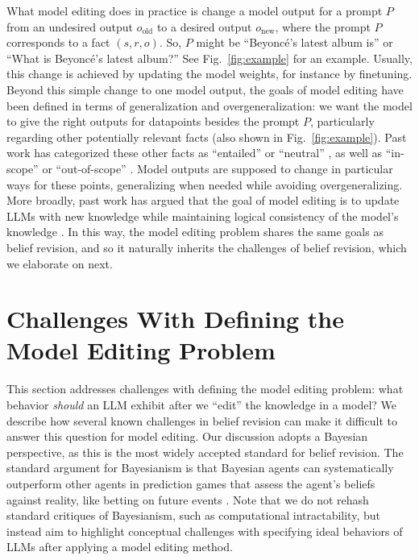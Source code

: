 \documentclass[11pt,a4paper]{article}
\newcommand{\beyonce}{Beyonc\'{e}\xspace}
\begin{document}
What model editing does in practice is change a model output for a prompt $P$ from an undesired output $o_\textrm{old}$ to a desired output $o_\textrm{new}$, where the prompt $P$ corresponds to a fact $(s,r,o)$. So, $P$ might be ``\beyonce's latest album is'' or ``What is \beyonce's latest album?'' See Fig.~\ref{fig:example} for an example. Usually, this change is achieved by updating the model weights, for instance by finetuning. Beyond this simple change to one model output, the goals of model editing have been defined in terms of generalization and overgeneralization: we want the model to give the right outputs for datapoints besides the prompt $P$, particularly regarding other potentially relevant facts (also shown in Fig.~\ref{fig:example}). Past work has categorized these other facts as ``entailed'' or ``neutral'' \citep{hase2021language}, as well as ``in-scope'' or ``out-of-scope'' \citep{mitchell2022memory}. 
Model outputs are supposed to change in particular ways for these points, generalizing when needed while avoiding overgeneralizing.
More broadly, past work has argued that the goal of model editing is to update LLMs with new knowledge while maintaining logical consistency of the model's knowledge \citep{de2021editing, mitchell2022memory, meng2022locating}. In this way, the model editing problem shares the same goals as belief revision, and so it naturally inherits the challenges of belief revision, which we elaborate on next. 

\section{Challenges With Defining the Model Editing Problem}
\label{sec:challenges_defining}

This section addresses challenges with defining the model editing problem: what behavior \emph{should} an LLM exhibit after we ``edit'' the knowledge in a model? 
We describe how several known challenges in belief revision can make it difficult to answer this question for model editing.
Our discussion adopts a Bayesian perspective, as this is the most widely accepted standard for belief revision.
The standard argument for Bayesianism is that Bayesian agents can systematically outperform other agents in prediction games that assess the agent's beliefs against reality, like betting on future events \cite[cf. Dutch book arguments;][]{sep-epistemology-bayesian}. Note that we do not rehash standard critiques of Bayesianism, such as computational intractability, but instead aim to highlight conceptual challenges with specifying ideal behaviors of LLMs after applying a model editing method.
\end{document}
